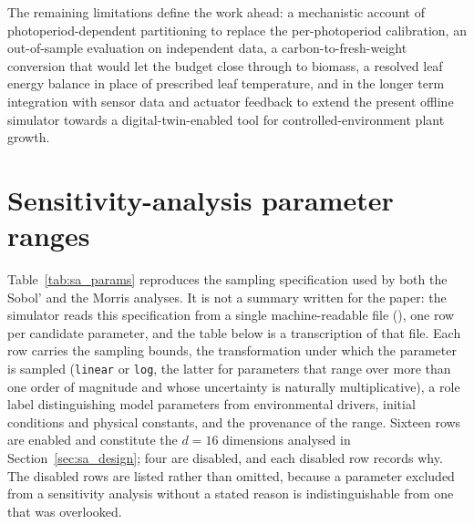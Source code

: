 \documentclass[a4paper,fleqn]{cas-sc}
\begin{document}
The remaining limitations define the work ahead: a mechanistic account of photoperiod-dependent partitioning to replace the per-photoperiod calibration, an out-of-sample evaluation on independent data, a carbon-to-fresh-weight conversion that would let the budget close through to biomass, a resolved leaf energy balance in place of prescribed leaf temperature, and in the longer term integration with sensor data and actuator feedback to extend the present offline simulator towards a digital-twin-enabled tool for controlled-environment plant growth.




%


\appendix

\section{Sensitivity-analysis parameter ranges}
\label{app:sensitivity_params}

Table~\ref{tab:sa_params} reproduces the sampling specification used by both
the Sobol' and the Morris analyses. It is not a summary written for the
paper: the simulator reads this specification from a single machine-readable
file (), one row per candidate
parameter, and the table below is a transcription of that file. Each row
carries the sampling bounds, the transformation under which the parameter is
sampled (\texttt{linear} or \texttt{log}, the latter for parameters that
range over more than one order of magnitude and whose uncertainty is
naturally multiplicative), a role label distinguishing model parameters from
environmental drivers, initial conditions and physical constants, and the
provenance of the range. Sixteen rows are enabled and constitute the
$d=16$ dimensions analysed in Section~\ref{sec:sa_design}; four are disabled,
and each disabled row records why. The disabled rows are listed rather than
omitted, because a parameter excluded from a sensitivity analysis without a
stated reason is indistinguishable from one that was overlooked.
\end{document}
